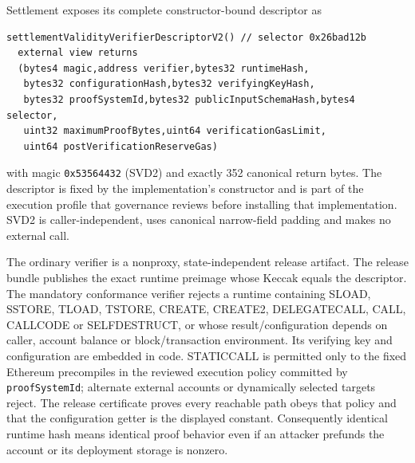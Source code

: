 \documentclass[a4paper,11pt]{article}
\newcommand{\code}[1]{\nolinkurl{#1}}
\begin{document}
Settlement exposes its complete constructor-bound descriptor as
\begin{verbatim}
settlementValidityVerifierDescriptorV2() // selector 0x26bad12b
  external view returns
  (bytes4 magic,address verifier,bytes32 runtimeHash,
   bytes32 configurationHash,bytes32 verifyingKeyHash,
   bytes32 proofSystemId,bytes32 publicInputSchemaHash,bytes4 selector,
   uint32 maximumProofBytes,uint64 verificationGasLimit,
   uint64 postVerificationReserveGas)
\end{verbatim}
with magic \code{0x53564432} (SVD2) and exactly 352 canonical return bytes.
The descriptor is fixed by the implementation's constructor and is part of the
execution profile that governance reviews before installing that
implementation.  SVD2 is caller-independent, uses canonical narrow-field
padding and makes no external call.

The ordinary verifier is a nonproxy, state-independent release artifact.  The
release bundle publishes the exact runtime preimage whose Keccak equals the
descriptor.  The mandatory conformance verifier rejects a runtime containing
SLOAD, SSTORE, TLOAD, TSTORE, CREATE, CREATE2, DELEGATECALL, CALL, CALLCODE or
SELFDESTRUCT, or whose result/configuration depends on caller, account balance
or block/transaction environment.  Its verifying key and configuration are
embedded in code.  STATICCALL is permitted only to the fixed Ethereum
precompiles in the reviewed execution policy committed by
\code{proofSystemId}; alternate external accounts or dynamically selected
targets reject.  The release certificate proves every reachable path obeys
that policy and that the configuration getter is the displayed constant.
Consequently identical runtime hash means identical proof behavior even if an
attacker prefunds the account or its deployment storage is nonzero.
\end{document}
